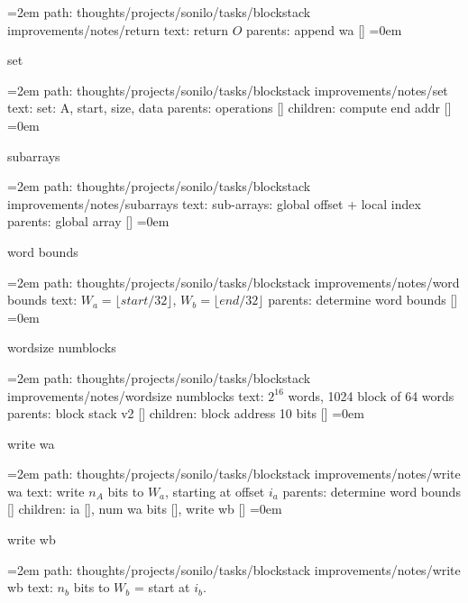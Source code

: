 \leftskip=2em
path: thoughts/projects/sonilo/tasks/blockstack improvements/notes/return
\smallskip
text:  return $O$
\smallskip
parents:  append wa []
\smallskip
\leftskip=0em
\par\endgroup
\bigskip
{}
set
\smallskip
\par\begingroup
\leftskip=2em
path: thoughts/projects/sonilo/tasks/blockstack improvements/notes/set
\smallskip
text:  set: A, start, size, data
\smallskip
parents:  operations []
\smallskip
children: compute end addr []
\smallskip
\leftskip=0em
\par\endgroup
\bigskip
{}
subarrays
\smallskip
\par\begingroup
\leftskip=2em
path: thoughts/projects/sonilo/tasks/blockstack improvements/notes/subarrays
\smallskip
text:  sub-arrays: global offset + local index
\smallskip
parents:  global array []
\smallskip
\leftskip=0em
\par\endgroup
\bigskip
{}
word bounds
\smallskip
\par\begingroup
\leftskip=2em
path: thoughts/projects/sonilo/tasks/blockstack improvements/notes/word bounds
\smallskip
text:  $W_a = \lfloor start / 32 \rfloor$, $W_b = \lfloor end / 32 \rfloor$
\smallskip
parents:  determine word bounds []
\smallskip
\leftskip=0em
\par\endgroup
\bigskip
{}
wordsize numblocks
\smallskip
\par\begingroup
\leftskip=2em
path: thoughts/projects/sonilo/tasks/blockstack improvements/notes/wordsize numblocks
\smallskip
text:  $2^{16}$ words, 1024 block of 64 words
\smallskip
parents:  block stack v2 []
\smallskip
children: block address 10 bits []
\smallskip
\leftskip=0em
\par\endgroup
\bigskip
{}
write wa
\smallskip
\par\begingroup
\leftskip=2em
path: thoughts/projects/sonilo/tasks/blockstack improvements/notes/write wa
\smallskip
text:  write $n_A$ bits to $W_a$, starting at offset $i_a$
\smallskip
parents:  determine word bounds []
\smallskip
children: ia [], num wa bits [], write wb []
\smallskip
\leftskip=0em
\par\endgroup
\bigskip
{}
write wb
\smallskip
\par\begingroup
\leftskip=2em
path: thoughts/projects/sonilo/tasks/blockstack improvements/notes/write wb
\smallskip
text:  $n_b$ bits to $W_b$ = start at $i_b$.
